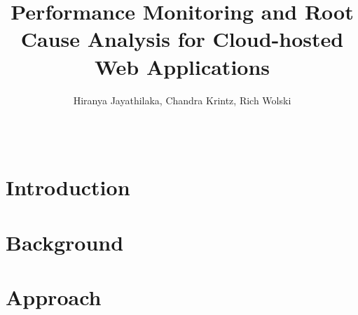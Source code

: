 \documentclass[letterpaper]{sig-alternate-2013}
\begin{document}
%

\title{Performance Monitoring and Root Cause Analysis for Cloud-hosted Web Applications}

\author{
%
\alignauthor
Hiranya Jayathilaka, Chandra Krintz, Rich Wolski\\
       \\
       \\
}

\maketitle

\begin{abstract}

\end{abstract}



\section{Introduction}


\section{Background}
\label{sec:background}


\section{Approach}
\label{sec:approach}

\end{document}
